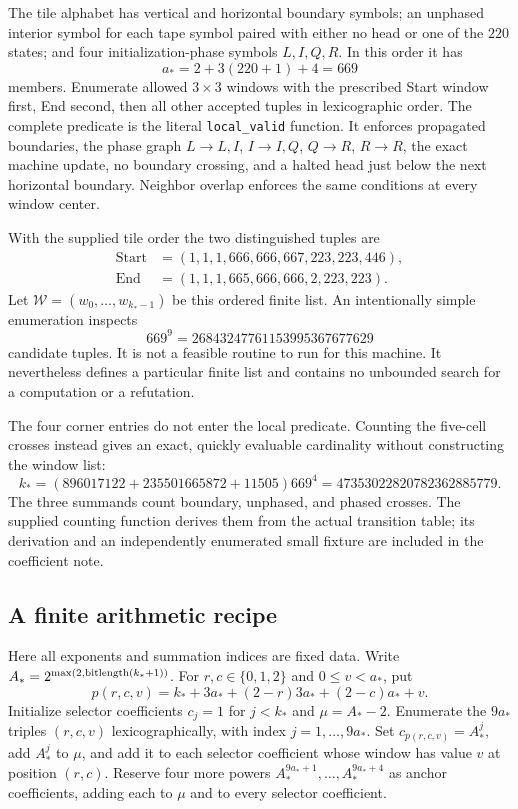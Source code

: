 \documentclass[11pt]{article}
\theoremstyle{remark}\newtheorem{remark}[theorem]{Remark}
\begin{document}
The tile alphabet has vertical and horizontal boundary symbols;
an unphased interior symbol for each tape symbol paired with either
no head or one of the $220$ states; and four initialization-phase
symbols $L,I,Q,R$. In this order it has
\[
 a_* =2+3(220+1)+4=669
\]
members. Enumerate allowed $3\times3$ windows with the prescribed
Start window first, End second, then all other accepted tuples in
lexicographic order. The complete predicate is the literal
\texttt{local\_valid} function. It enforces propagated boundaries,
the phase graph $L\to L,I$, $I\to I,Q$, $Q\to R$, $R\to R$,
the exact machine update, no boundary crossing, and a halted head
just below the next horizontal boundary. Neighbor overlap enforces
the same conditions at every window center.

With the supplied tile order the two distinguished tuples are
\begin{align*}
 \mathrm{Start}&=(1,1,1,666,666,667,223,223,446),\\
 \mathrm{End}&=(1,1,1,665,666,666,2,223,223).
\end{align*}
Let $\mathcal W=(w_0,\ldots,w_{k_*-1})$ be this ordered finite
list. An intentionally simple enumeration inspects
\[
 669^9=26843247761153995367677629
\]
candidate tuples. It is not a feasible routine to run for this machine.
It nevertheless defines a particular finite list and contains no
unbounded search for a computation or a refutation.

The four corner entries do not enter the local predicate. Counting
the five-cell crosses instead gives an exact, quickly evaluable
cardinality without constructing the window list:
\[
 k_*=(896017122+235501665872+11505)669^4
     =47353022820782362885779.
\]
The three summands count boundary, unphased, and phased crosses.
The supplied counting function derives them from the actual transition
table; its derivation and an independently enumerated small fixture
are included in the coefficient note.

\subsection{A finite arithmetic recipe}

Here all exponents and summation indices are fixed data. Write
$A_*=2^{\max(2,\operatorname{bitlength}(k_*+1))}$. For $r,c\in\{0,1,2\}$ and
$0\le v<a_*$, put
\[
 p(r,c,v)=k_*+3a_*+(2-r)3a_*+(2-c)a_*+v.
\]
Initialize selector coefficients $c_j=1$ for $j<k_*$ and
$\mu=A_*-2$. Enumerate the $9a_*$ triples $(r,c,v)$ lexicographically,
with index $j=1,\ldots,9a_*$. Set $c_{p(r,c,v)}=A_*^j$, add
$A_*^j$ to $\mu$, and add it to each selector coefficient whose
window has value $v$ at position $(r,c)$. Reserve four more powers
$A_*^{9a_*+1},\ldots,A_*^{9a_*+4}$ as anchor coefficients, adding
each to $\mu$ and to every selector coefficient.
\end{document}
